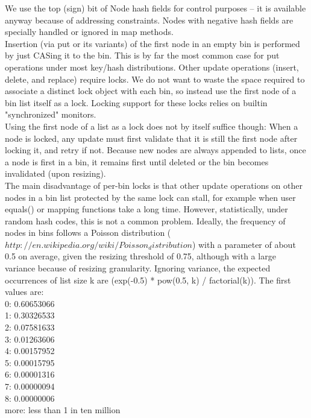 \documentclass[UTF8,11pt]{ctexbook}
\begin{document}
	We use the top (sign) bit of Node hash fields for control
	purposes -- it is available anyway because of addressing
	constraints.  Nodes with negative hash fields are specially
	handled or ignored in map methods.\\
	
	Insertion (via put or its variants) of the first node in an
	empty bin is performed by just CASing it to the bin.  This is
	by far the most common case for put operations under most
	key/hash distributions.  Other update operations (insert,
	delete, and replace) require locks.  We do not want to waste
	the space required to associate a distinct lock object with
	each bin, so instead use the first node of a bin list itself as
	a lock. Locking support for these locks relies on builtin
	"synchronized" monitors.\\
	
	Using the first node of a list as a lock does not by itself
	suffice though: When a node is locked, any update must first
	validate that it is still the first node after locking it, and
	retry if not. Because new nodes are always appended to lists,
	once a node is first in a bin, it remains first until deleted
	or the bin becomes invalidated (upon resizing).\\
	
	The main disadvantage of per-bin locks is that other update
	operations on other nodes in a bin list protected by the same
	lock can stall, for example when user equals() or mapping
	functions take a long time.  However, statistically, under
	random hash codes, this is not a common problem.  Ideally, the
	frequency of nodes in bins follows a Poisson distribution
	($http://en.wikipedia.org/wiki/Poisson_distribution$) with a
	parameter of about 0.5 on average, given the resizing threshold
	of 0.75, although with a large variance because of resizing
	granularity. Ignoring variance, the expected occurrences of
	list size k are (exp(-0.5) * pow(0.5, k) / factorial(k)). The
	first values are:\\
	
	0:    0.60653066\\
	1:    0.30326533\\
	2:    0.07581633\\
	3:    0.01263606\\
	4:    0.00157952\\
	5:    0.00015795\\
	6:    0.00001316\\
	7:    0.00000094\\
	8:    0.00000006\\
	more: less than 1 in ten million\\
	
\end{document}
